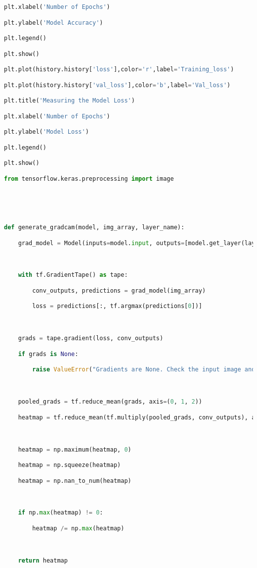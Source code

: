 \documentclass{article}
\begin{document}
\begin{lstlisting}[style=mystyle,language=Python]
plt.xlabel('Number of Epochs')

plt.ylabel('Model Accuracy')

plt.legend()

plt.show()

plt.plot(history.history['loss'],color='r',label='Training_loss')

plt.plot(history.history['val_loss'],color='b',label='Val_loss')

plt.title('Measuring the Model Loss')

plt.xlabel('Number of Epochs')

plt.ylabel('Model Loss')

plt.legend()

plt.show()

from tensorflow.keras.preprocessing import image





def generate_gradcam(model, img_array, layer_name):

    grad_model = Model(inputs=model.input, outputs=[model.get_layer(layer_name).output, model.output])



    with tf.GradientTape() as tape:

        conv_outputs, predictions = grad_model(img_array)

        loss = predictions[:, tf.argmax(predictions[0])]



    grads = tape.gradient(loss, conv_outputs)

    if grads is None:

        raise ValueError("Gradients are None. Check the input image and model.")



    pooled_grads = tf.reduce_mean(grads, axis=(0, 1, 2))

    heatmap = tf.reduce_mean(tf.multiply(pooled_grads, conv_outputs), axis=-1)



    heatmap = np.maximum(heatmap, 0)

    heatmap = np.squeeze(heatmap)

    heatmap = np.nan_to_num(heatmap)



    if np.max(heatmap) != 0:

        heatmap /= np.max(heatmap)



    return heatmap




\end{lstlisting}
\end{document}
